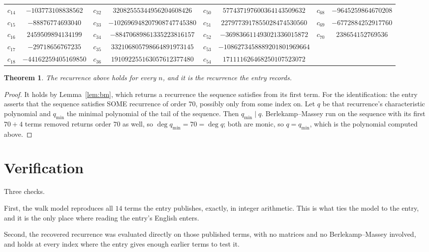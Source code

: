 \documentclass[11pt,a4paper]{article}
\theoremstyle{plain}
\newtheorem{theorem}{Theorem}
\theoremstyle{definition}
\begin{document}
\begin{center}
\begin{tabular}{cccccccc}
$c_{14}$ & $-103773108838562$ & $c_{32}$ & $32082555344956204608426$ & $c_{50}$ & $577437197600364143509632$ & $c_{68}$ & $-9645259864670208$ \\
$c_{15}$ & $-88876774693040$ & $c_{33}$ & $-102696948207908747745380$ & $c_{51}$ & $2279773917855028474530560$ & $c_{69}$ & $-6772884252917760$ \\
$c_{16}$ & $2459509894134199$ & $c_{34}$ & $-88470689861335223816157$ & $c_{52}$ & $-369836611493021336015872$ & $c_{70}$ & $238654152769536$ \\
$c_{17}$ & $-29718656767235$ & $c_{35}$ & $332106805798664891973145$ & $c_{53}$ & $-1086273458889201801969664$ &  &  \\
$c_{18}$ & $-44162259405169850$ & $c_{36}$ & $191092255163057612377480$ & $c_{54}$ & $171111626468250107523072$ &  &  \\
\end{tabular}
\end{center}

\begin{theorem}
The recurrence above holds for every $n$, and it is the recurrence the entry records.
\end{theorem}

\begin{proof}
It holds by Lemma~\ref{lem:bm}, which returns a recurrence the sequence satisfies from its
first term. For the identification: the entry asserts that the sequence satisfies SOME
recurrence of order $70$, possibly only from some index on. Let $q$ be that recurrence's
characteristic polynomial and $q_{\min}$ the minimal polynomial of the tail of the sequence.
Then $q_{\min}\mid q$. Berlekamp--Massey run on the sequence with its first $70+4$ terms
removed returns order $70$ as well, so $\deg q_{\min}=70=\deg q$; both are monic, so
$q=q_{\min}$, which is the polynomial computed above.
\end{proof}

\section{Verification}

Three checks.

First, the walk model reproduces all $14$ terms the entry publishes, exactly, in integer
arithmetic. This is what ties the model to the entry, and it is the only place where reading
the entry's English enters.

Second, the recovered recurrence was evaluated directly on those published terms, with no
matrices and no Berlekamp--Massey involved, and holds at every index where the entry gives
enough earlier terms to test it.
\end{document}
